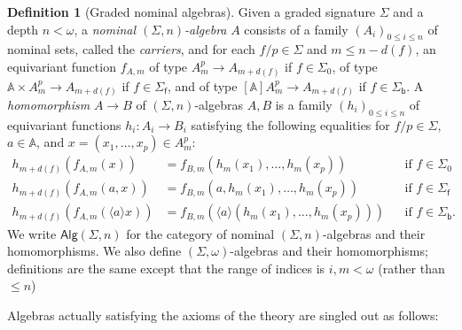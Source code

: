 \documentclass[11pt,a4paper]{amsart}
\newcommand{\Alg}{\mathsf{Alg}}
\newcommand{\sigp}{\Sigma_0}
\newcommand{\sigf}{\Sigma_{\mathsf f}}
\newcommand{\sigb}{\Sigma_{\mathsf b}}
\newcommand{\Names}{\mathbb{A}}
\newcommand{\bind}[1]{\langle #1\rangle}
\theoremstyle{plain}
\numberwithin{equation}{section}
\newcommand{\+}[1]{\mathcal{#1}\xspace}
\theoremstyle{definition}
\newtheorem{defn}[defn]{Definition}
\begin{document}
\begin{defn}[Graded nominal algebras]
  Given a graded signature \(\Sigma\) and a depth \(n < \omega\), a
  \emph{nominal \((\Sigma, n)\)-algebra} \(A\) consists of a family
  \((A_i)_{0 \le i \le n}\) of nominal sets, called the
  \emph{carriers}, and for each \(f/p \in \Sigma\) and
  $m \le n- d(f)$, an equivariant function $f_{A, m}$ of type
  \(A_m^p \to A_{m + d(f)}\) if $f\in\sigp$, of type
  \(\Names \times A_m^p \to A_{m + d(f)}\) if $f\in\sigf$, and of type
  \( [\Names]A_m^p \to A_{m + d(f)}\) if $f\in\sigb$. A
  \emph{homomorphism} $A\to B$ of \((\Sigma, n)\)-algebras \(A, B\) is
  a family \((h_i)_{0 \le i \le n}\) of equivariant functions
  \(h_i\colon A_i \to B_i\) satisfying the following equalities for
  \(f/p \in \Sigma\), $a\in\Names$, and \(x = (x_1, \ldots, x_p) \in A_m^p\):
  \begin{align*}
    h_{m + d(f)}(f_{A, m}(x)) & = f_{B, m}(h_m(x_1), \ldots, h_m(x_p)) && \text{if $f\in\sigp$}\\
    h_{m + d(f)}(f_{A, m}(a,x)) & = f_{B, m}(a,h_m(x_1), \ldots, h_m(x_p))&& \text{if $f\in\sigf$}\\
    h_{m + d(f)}(f_{A, m}(\bind{a}x)) & = f_{B, m}(\bind{a}(h_m(x_1), \ldots, h_m(x_p))) && \text{if $f\in\sigb$}.
  \end{align*}
  We write \(\Alg(\Sigma, n)\) for the category of nominal
  \((\Sigma, n)\)-algebras and their homomorphisms. We also define
  $(\Sigma,\omega)$-algebras and their homomorphisms; definitions are
  the same except that the range of indices is $i,m<\omega$ (rather
  than $\le n$)
\end{defn}
\noindent Algebras actually satisfying the axioms of the theory are
singled out as follows:
\end{document}
